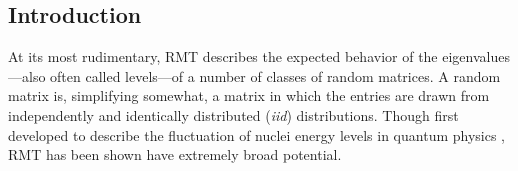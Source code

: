\documentclass[12pt]{spieman}  %
\begin{document}
\begin{spacing}{2}   %

\section{Introduction}
\label{sect:intro}  %

At its most rudimentary, RMT describes the expected behavior of the
eigenvalues—also often called levels—of a number of classes of random
matrices\cite{andersonIntroductionRandomMatrices2010,
akemannOxfordHandbookRandom2011, mehtaRandomMatrices2004}. A random matrix is,
simplifying somewhat, a matrix in which the entries are drawn from
independently and identically distributed (\textit{iid}) distributions. Though
first developed to describe the fluctuation of nuclei energy levels in quantum
physics \cite{mehtaRandomMatrices2004, guhrRandommatrixTheoriesQuantum1998a},
RMT has been shown have extremely broad potential.


\end{spacing}
\end{document}
